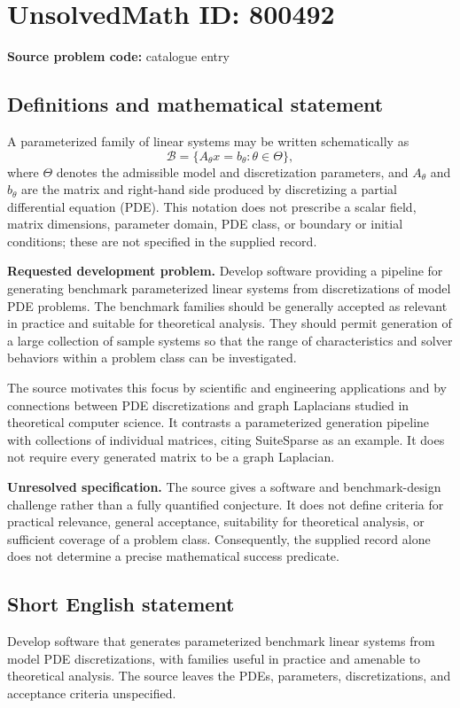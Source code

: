 \documentclass[11pt]{article}
\begin{document}
\section*{UnsolvedMath ID: 800492}
\textbf{Source problem code:} catalogue entry
\subsection{Definitions and mathematical statement}
A parameterized family of linear systems may be written schematically as
\[
\mathcal{B}=\{A_{\theta}x=b_{\theta}:\theta\in\Theta\},
\]
where \(\Theta\) denotes the admissible model and discretization parameters, and \(A_{\theta}\) and \(b_{\theta}\) are the matrix and right-hand side produced by discretizing a partial differential equation (PDE). This notation does not prescribe a scalar field, matrix dimensions, parameter domain, PDE class, or boundary or initial conditions; these are not specified in the supplied record.

\textbf{Requested development problem.} Develop software providing a pipeline for generating benchmark parameterized linear systems from discretizations of model PDE problems. The benchmark families should be generally accepted as relevant in practice and suitable for theoretical analysis. They should permit generation of a large collection of sample systems so that the range of characteristics and solver behaviors within a problem class can be investigated.

The source motivates this focus by scientific and engineering applications and by connections between PDE discretizations and graph Laplacians studied in theoretical computer science. It contrasts a parameterized generation pipeline with collections of individual matrices, citing SuiteSparse as an example. It does not require every generated matrix to be a graph Laplacian.

\textbf{Unresolved specification.} The source gives a software and benchmark-design challenge rather than a fully quantified conjecture. It does not define criteria for practical relevance, general acceptance, suitability for theoretical analysis, or sufficient coverage of a problem class. Consequently, the supplied record alone does not determine a precise mathematical success predicate.
\subsection{Short English statement}
Develop software that generates parameterized benchmark linear systems from model PDE discretizations, with families useful in practice and amenable to theoretical analysis. The source leaves the PDEs, parameters, discretizations, and acceptance criteria unspecified.
\end{document}
